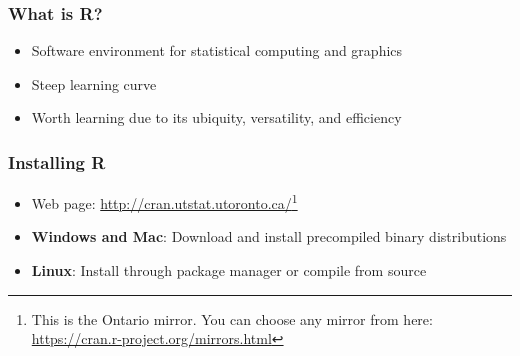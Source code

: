 \documentclass{beamer}
\begin{document}


\begin{frame}
    \frametitle{What is R?}
    \begin{itemize}
	  \item Software environment for statistical computing and graphics
	  \item Steep learning curve
	  \item Worth learning due to its ubiquity, versatility, and efficiency
    \end{itemize}
\end{frame}


\begin{frame}
	\frametitle{Installing R}
	\begin{itemize}
	  \item Web page: \url{http://cran.utstat.utoronto.ca/}\footnote{This is the Ontario mirror. You can choose any mirror from here: \url{https://cran.r-project.org/mirrors.html}}
	  \item \textbf{Windows and Mac}: Download and install precompiled binary distributions
	  \item \textbf{Linux}: Install through package manager or compile from source
	\end{itemize}
\end{frame}
\end{document}
